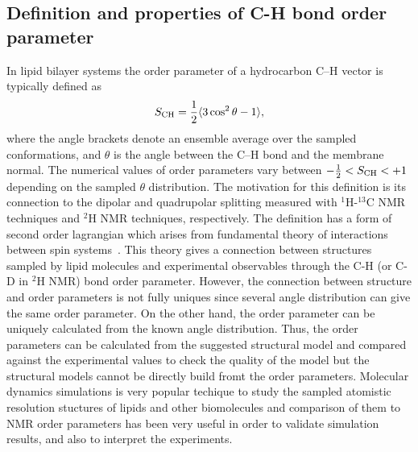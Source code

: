 \documentclass[aps,prl,superscriptaddress,twocolumn]{revtex4}
\begin{document}
\subsection{Definition and properties of C-H bond order parameter}\label{OPdefinition}
In lipid bilayer systems the order parameter of a hydrocarbon C--H vector is typically defined as 
\begin{equation}\label{orderP}
S_{{\rm CH}}=\frac{1}{2}\langle 3 \cos^2 \theta-1 \rangle,
\end{equation} 
where the angle brackets denote an ensemble average over the sampled conformations, and $\theta$ is the angle between the C--H bond and the membrane normal.
The numerical values of order parameters vary between $-\frac{1}{2} < S_{{\rm CH}} < +1$
depending on the sampled $\theta$ distribution.
The motivation for this definition is its connection to the dipolar and quadrupolar splitting measured with
$^1$H-$^{13}$C NMR techniques and $^2$H NMR techniques, respectively. The definition has a form of
second order lagrangian which arises from fundamental theory of interactions between spin systems~\cite{abragam}.
This theory gives a connection between structures sampled by lipid molecules and experimental observables
through the C-H (or C-D in $^2$H NMR) bond order parameter. However, the connection between structure
and order parameters is not fully uniques since several angle distribution can give the same order parameter.
On the other hand, the order parameter can be uniquely calculated from the known angle distribution.
Thus, the order parameters can be calculated from the suggested structural model and compared against
the experimental values to check the quality of the model but the structural models cannot be directly
build fromt the order parameters. Molecular dynamics simulations is very popular techique to study the
sampled atomistic resolution stuctures of lipids and other biomolecules and comparison of them 
to NMR order parameters has been very useful in order to validate simulation results, and also to interpret
the experiments.
\end{document}
